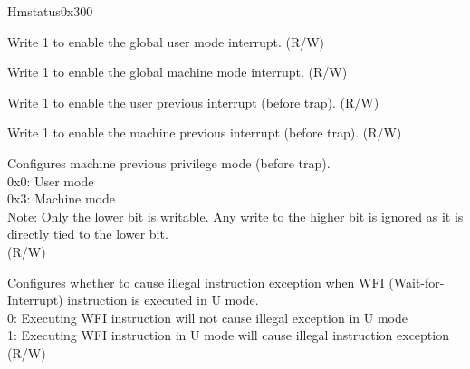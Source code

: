 \begin{register}{H}{mstatus}{0x300}\label{regdesc:MSTATUS}
%
%
%
%
%
%
%
%
%
%
%
\regnewline%
\begin{regdesc}\begin{reglist}
\label{fielddesc:MSTATUSUIE}\item [UIE] Write 1 to enable the global user mode interrupt. (R/W)
\label{fielddesc:MSTATUSMIE}\item [MIE] Write 1 to enable the global machine mode interrupt. (R/W)
\label{fielddesc:MSTATUSUPIE}\item [UPIE] Write 1 to enable the user previous interrupt (before trap). (R/W)
\label{fielddesc:MSTATUSMPIE}\item [MPIE] Write 1 to enable the machine previous interrupt (before trap). (R/W)
\label{fielddesc:MSTATUSMPP}\item [MPP] Configures machine previous privilege mode (before trap).\\
0x0: User mode\\
0x3: Machine mode\\
Note: Only the lower bit is writable. Any write to the higher bit is ignored as it is directly tied to the lower bit.\\
(R/W)
\label{fielddesc:MSTATUSTW}\item [TW] Configures whether to cause illegal instruction exception when WFI (Wait-for-Interrupt) instruction is executed in U mode. \\
0: Executing WFI instruction will not cause illegal exception in U mode\\
1: Executing WFI instruction in U mode will cause illegal instruction exception\\
(R/W)
\end{reglist}\end{regdesc}
\end{register}

